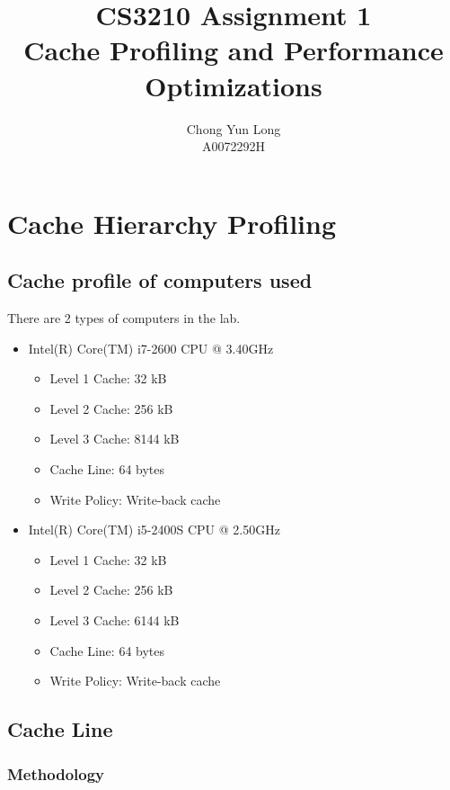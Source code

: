 \documentclass{article}
\title{CS3210 Assignment 1 \\ Cache Profiling and Performance Optimizations}
\author{Chong Yun Long \\A0072292H}
\date{}
\begin{document}
\maketitle

\newpage 

\section{Cache Hierarchy Profiling}

\subsection{Cache profile of computers used}

There are 2 types of computers in the lab.
\newline

\begin{itemize}
\item Intel(R) Core(TM) i7-2600 CPU @ 3.40GHz
  \begin{itemize}
      \item Level 1 Cache: 32 kB
      \item Level 2 Cache: 256 kB
      \item Level 3 Cache: 8144 kB
  \item Cache Line: 64 bytes
  \item Write Policy: Write-back cache
    \end{itemize}
\end{itemize}


\begin{itemize}
\item Intel(R) Core(TM) i5-2400S CPU @ 2.50GHz
  \begin{itemize}
      \item Level 1 Cache: 32 kB
      \item Level 2 Cache: 256 kB
      \item Level 3 Cache: 6144 kB
  \item Cache Line: 64 bytes
  \item Write Policy: Write-back cache
    \end{itemize}
\end{itemize}

\subsection{Cache Line}

\subsubsection{Methodology}
\end{document}
